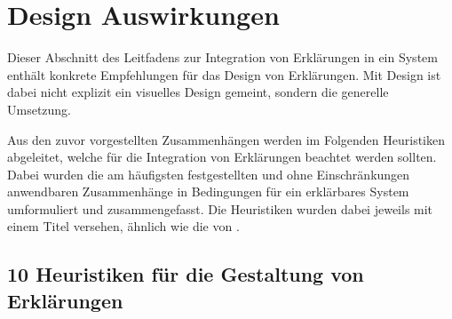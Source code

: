 \section{Design Auswirkungen}
\label{sec:model_design_implications}

Dieser Abschnitt des Leitfadens zur Integration von Erklärungen in ein System enthält konkrete Empfehlungen für das Design von Erklärungen. Mit Design ist dabei nicht explizit ein visuelles Design gemeint, sondern die generelle Umsetzung.

Aus den zuvor vorgestellten Zusammenhängen werden im Folgenden Heuristiken abgeleitet, welche für die Integration von Erklärungen beachtet werden sollten. Dabei wurden die am häufigsten festgestellten und ohne Einschränkungen anwendbaren Zusammenhänge in Bedingungen für ein erklärbares System umformuliert und zusammengefasst. Die Heuristiken wurden dabei jeweils mit einem Titel versehen, ähnlich wie die  von \citeauthor{nielsen10usability} \cite{nielsen10usability}.


\subsection*{10 Heuristiken für die Gestaltung von Erklärungen}

